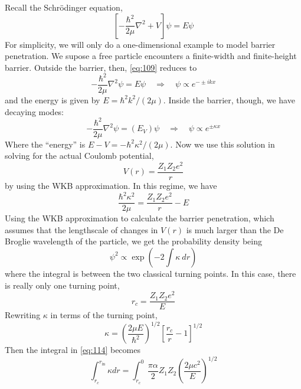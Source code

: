 \documentclass[10pt]{article}
\numberwithin{equation}{section}
\begin{document}
  Recall the Schr\"odinger equation,
  \begin{equation}
    \label{eq:109}
    \left[-\frac{\hbar^2}{2\mu}\nabla^2+V\right]\psi=E\psi
  \end{equation}
  For simplicity, we will only do a one-dimensional example to model
  barrier penetration. We supose a free particle encounters a
  finite-width and finite-height barrier. Outside the barrier, then,
  \eqref{eq:109} reduces to
  \begin{equation}
    \label{eq:110}
    -\frac{\hbar^2}{2\mu}\nabla^2\psi=E\psi\quad\Rightarrow\quad
    \psi\propto e^{-\pm ikx}
  \end{equation}
  and the energy is given by $E=\hbar^2k^2/(2\mu)$. Inside the
  barrier, though, we have decaying modes:
  \begin{equation}
    \label{eq:111}
    -\frac{\hbar^2}{2\mu}\nabla^2\psi=(E_V)\psi\quad\Rightarrow\quad
    \psi\propto e^{\pm\kappa x}
  \end{equation}
  Where the ``energy'' is $E-V=-\hbar^2\kappa^2/(2\mu)$. Now we use
  this solution in solving for the actual Coulomb potential,
  \begin{equation}
    \label{eq:112}
    V(r)=\frac{Z_1Z_2 e^2}{r}
  \end{equation}
  by using the WKB approximation. In this regime, we have
  \begin{equation}
    \label{eq:113}
    \frac{\hbar^2\kappa^2}{2\mu}=\frac{Z_1Z_2 e^2}{r}-E
  \end{equation}
  Using the WKB approximation to calculate the barrier penetration,
  which assumes that the lengthscale of changes in $V(r)$ is much
  larger than the De Broglie wavelength of the particle, we get the
  probability density being
  \begin{equation}
    \label{eq:114}
    \psi^2\propto \exp\left(-2\int \kappa\ dr\right)
  \end{equation}
  where the integral is between the two classical turning points. In
  this case, there is really only one turning point,
  \begin{equation}
    \label{eq:115}
    r_c=\frac{Z_1Z_2 e^2}{E}
  \end{equation}
  Rewriting $\kappa$ in terms of the turning point,
  \begin{equation}
    \label{eq:116}
    \kappa = \left(\frac{2\mu E}{\hbar^2}\right)^{1/2}\left[\frac{r_c}{r}-1\right]^{1/2}
  \end{equation}
  Then the integral in \eqref{eq:114} becomes
  \begin{equation}
    \label{eq:117}
    \int_{r_c}^{r_{\mathrm{in}}}\kappa dr=
      \int_{r_c}^0\frac{\pi\alpha}{2}Z_1Z_2\left(\frac{2\mu c^2}{E}\right)^{1/2}
  \end{equation}
\end{document}
